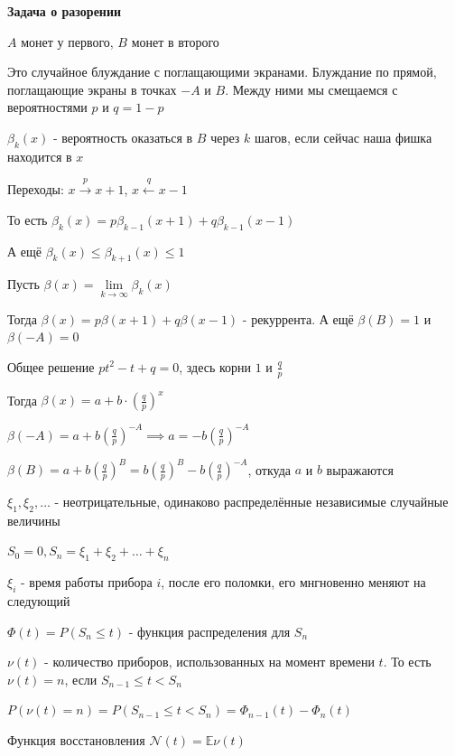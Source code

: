 \begin{example}
    \textbf{Задача о разорении}

    $A$ монет у первого, $B$ монет в второго

    Это случайное блуждание с поглащающими экранами. Блуждание по прямой, поглащающие экраны в точках $-A$ и $B$.
    Между ними мы смещаемся с вероятностями $p$ и $q = 1 - p$

    $\beta_k (x)$ - вероятность оказаться в $B$ через $k$ шагов, если сейчас наша фишка находится в $x$

    Переходы: $x \overset{p}{\rightarrow} x + 1$, $x \overset{q}{\leftarrow} x - 1$

    То есть $\beta_k (x) = p \beta_{k - 1} (x + 1) + q \beta_{k - 1} (x - 1)$

    А ещё $\beta_k (x) \leqslant \beta_{k + 1} (x) \leqslant 1$

    Пусть $\beta (x) = \lim\limits_{k \to \infty} \beta_k (x)$

    Тогда $\beta (x) = p \beta (x + 1) + q \beta (x - 1)$ - рекуррента. А ещё $\beta (B) = 1$ и $\beta (-A) = 0$

    Общее решение $pt^2 - t + q = 0$, здесь корни $1$ и $\frac{q}{p}$

    Тогда $\beta (x) = a + b \cdot \left( \frac{q}{p} \right)^x$
    
    $\beta (-A) = a + b \left( \frac{q}{p} \right)^{-A} \implies a = -b \left( \frac{q}{p}\right)^{-A}$

    $\beta (B) = a + b \left( \frac{q}{p} \right)^B = b \left( \frac{q}{p} \right)^B - b \left( \frac{q}{p} \right)^{-A}$, откуда $a$ и $b$ выражаются
\end{example}


\begin{definition}
    $\xi_1, \xi_2, \ldots$ - неотрицательные, одинаково распределённые независимые случайные величины

    $S_0 = 0, S_n = \xi_1 + \xi_2 + \ldots + \xi_n$

    $\xi_i$ - время работы прибора $i$, после его поломки, его мнгновенно меняют на следующий

    $\Phi (t) = P(S_n \leqslant t)$ - функция распределения для $S_n$

    $\nu (t)$ - количество приборов, использованных на момент времени $t$. То есть $\nu (t) = n$, если $S_{n-1} \leqslant t < S_n$

    $P(\nu (t) = n) = P(S_{n - 1} \leqslant t < S_n) = \Phi_{n-1} (t) - \Phi_n (t)$

    Функция восстановления $\mathcal{N} (t) = \mathbb{E} \nu (t)$
\end{definition}

